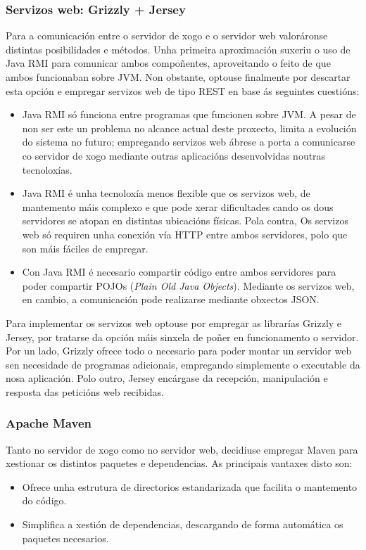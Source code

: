 \subsubsection{Servizos web: Grizzly + Jersey}
Para a comunicación entre o servidor de xogo e o servidor web valoráronse
distintas posibilidades e métodos. Unha primeira aproximación suxeriu o uso de
Java RMI para comunicar ambos compoñentes, aproveitando o feito de que ambos
funcionaban sobre JVM. Non obstante, optouse finalmente por descartar esta
opción e empregar servizos web de tipo REST en base ás seguintes cuestións:
\begin{itemize}
  \item Java RMI só funciona entre programas que funcionen sobre JVM. A pesar de
  non ser este un problema no alcance actual deste proxecto, limita a evolución
  do sistema no futuro; empregando servizos web ábrese a porta a comunicarse co
  servidor de xogo mediante outras aplicacións desenvolvidas noutras
  tecnoloxías.
  \item Java RMI é unha tecnoloxía menos flexible que os servizos
  web, de mantemento máis complexo e que pode xerar dificultades cando os dous
  servidores se atopan en distintas ubicacións físicas. Pola contra, Os servizos
  web só requiren unha conexión vía HTTP entre ambos servidores, polo que son
  máis fáciles de empregar.
  \item Con Java RMI é necesario compartir código entre ambos servidores para
  poder compartir POJOs ({\it Plain Old Java Objects}). Mediante os servizos
  web, en cambio, a comunicación pode realizarse mediante obxectos JSON.
\end{itemize}
Para implementar os servizos web optouse por empregar as librarías Grizzly e
Jersey, por tratarse da opción máis sinxela de poñer en funcionamento o
servidor. Por un lado, Grizzly ofrece todo o necesario para poder montar un
servidor web sen necesidade de programas adicionais, empregando simplemente o
executable da nosa aplicación. Polo outro, Jersey encárgase da recepción,
manipulación e resposta das peticións web recibidas.

\subsubsection{Apache Maven}
Tanto no servidor de xogo como no servidor web, decidiuse empregar Maven para
xestionar os distintos paquetes e dependencias. As principais vantaxes disto
son:
\begin{itemize}
  \item Ofrece unha estrutura de directorios estandarizada que facilita o
  mantemento do código.
  \item Simplifica a xestión de dependencias, descargando de forma automática os
  paquetes necesarios.
\end{itemize}

